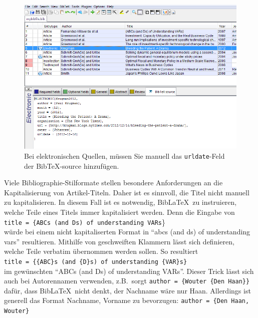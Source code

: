 \documentclass[a4paper,12pt]{scrartcl} %
\makeatletter
\def\ScaleIfNeeded{%
\ifdim\Gin@nat@width>\linewidth
\linewidth
\else
\Gin@nat@width
\fi
}
\makeatother
\begin{document}
\begin{figure}[t!]
\includegraphics[width=\ScaleIfNeeded]{Urldate}
\caption[Einfügen von elektronischen Quellen]{Bei elektronischen Quellen, müssen Sie manuell das \texttt{urldate}-Feld der Bib\TeX-source hinzufügen.}\label{fig:jabref_urldate}
\end{figure}

Viele Bibliographie-Stilformate stellen besondere Anforderungen an die Kapitalisierung von Artikel-Titeln. Daher ist es sinnvoll, die Titel nicht manuell zu kapitalisieren. In diesem Fall ist es notwendig, Bib\LaTeX\ zu instruieren, welche Teile eines Titels immer kapitalisiert werden. Denn die Eingabe von\\
\texttt{title     = \{ABCs (and Ds) of understanding VARs}\}\\
würde bei einem nicht kapitaliserten Format in ``abcs (and ds) of understanding vars'' resultieren. Mithilfe von geschweiften Klammern lässt sich definieren, welche Teile verbatim übernommen werden sollen. So resultiert\\
\texttt{title     = \{\{ABC\}s (and \{D\}s) of understanding \{VAR\}s\}}\\
im gewünschten ``ABCs (and Ds) of understanding VARs''. Dieser Trick lässt sich auch bei Autorennamen verwenden, z.B.\ sorgt
\texttt{author     = \{Wouter \{Den Haan\}\}}\\
dafür, dass Bib\LaTeX\ nicht denkt, der Nachname wäre nur Haan. Allerdings ist generell das Format Nachname, Vorname zu bevorzugen:
\texttt{author     = \{Den Haan, Wouter\}}\\


\clearpage
\end{document}
